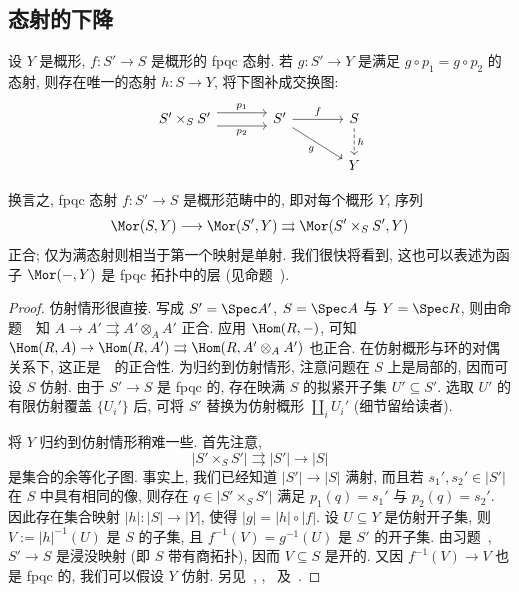\subsection{态射的下降}\label{src:3.1.2-subsection}
\begin{proposition}\label{src:3.1.7}
设 $Y$ 是概形, $f:S'\to S$ 是概形的 fpqc 态射. 若 $g:S'\to Y$ 是满足 $g\circ p_1=g\circ p_2$ 的态射, 则存在唯一的态射 $h:S\to Y$, 将下图补成交换图:
\[
\begin{tikzcd}[column sep=large]
S'\times_S S'\arrow[r,shift left=1.1ex,"p_1"]
\arrow[r,shift right=1.1ex,"p_2"']&
S'\arrow[r,"f"]\arrow[dr,"g"']&S\arrow[d,dashed,"h"]\\
&&Y
\end{tikzcd}
\]
\end{proposition}
换言之, fpqc 态射 $f:S'\to S$ 是概形范畴中的, 即对每个概形 $Y$, 序列
\begin{equation}\label{src:3.1.8}
\Mor(S,Y)\longrightarrow\Mor(S',Y)\rightrightarrows\Mor(S'\times_S S',Y)
\end{equation}
正合; 仅为满态射则相当于第一个映射是单射. 我们很快将看到, 这也可以表述为函子 $\Mor(-,Y)$ 是 fpqc 拓扑中的层 (见命题~).
\begin{proof}
仿射情形很直接. 写成 $S'=\Spec A'$, $S=\Spec A$ 与 $Y=\Spec R$, 则由命题~~知 $A\to A'\rightrightarrows A'\otimes_A A'$ 正合. 应用 $\Hom(R,-)$, 可知 $\Hom(R,A)\to\Hom(R,A')\rightrightarrows\Hom(R,A'\otimes_A A')$ 也正合. 在仿射概形与环的对偶关系下, 这正是~~的正合性. 为归约到仿射情形, 注意问题在 $S$ 上是局部的, 因而可设 $S$ 仿射. 由于 $S'\to S$ 是 fpqc 的, 存在映满 $S$ 的拟紧开子集 $U'\subseteq S'$. 选取 $U'$ 的有限仿射覆盖 $\{U_i'\}$ 后, 可将 $S'$ 替换为仿射概形 $\coprod_i U_i'$ (细节留给读者).

将 $Y$ 归约到仿射情形稍难一些. 首先注意,
\begin{equation}\label{src:3.1.9}
|S'\times_S S'|\rightrightarrows|S'|\longrightarrow|S|
\end{equation}
是集合的余等化子图. 事实上, 我们已经知道 $|S'|\to|S|$ 满射, 而且若 $s_1',s_2'\in|S'|$ 在 $S$ 中具有相同的像, 则存在 $q\in|S'\times_S S'|$ 满足 $p_1(q)=s_1'$ 与 $p_2(q)=s_2'$. 因此存在集合映射 $|h|:|S|\to|Y|$, 使得 $|g|=|h|\circ|f|$. 设 $U\subseteq Y$ 是仿射开子集, 则 $V:=|h|^{-1}(U)$ 是 $S$ 的子集, 且 $f^{-1}(V)=g^{-1}(U)$ 是 $S'$ 的开子集. 由习题~, $S'\to S$ 是浸没映射 (即 $S$ 带有商拓扑), 因而 $V\subseteq S$ 是开的. 又因 $f^{-1}(V)\to V$ 也是 fpqc 的, 我们可以假设 $Y$ 仿射. 另见~\cite[定理 $2$, 第 317 页]{FGAI}, \cite[定理 $6$(a)]{BLR90}, \cite[定理 $2.55$]{Vis05}~及~\cite[Tag 023Q]{SP}.
\end{proof}
